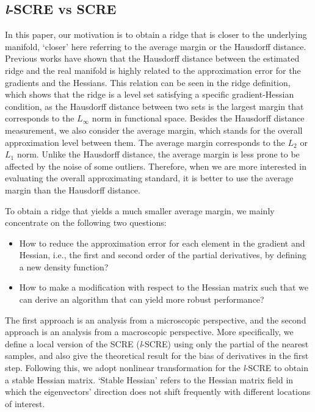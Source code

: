 \documentclass[aos,preprint]{imsart}
\theoremstyle{remark}
\begin{document}
\subsection{{\it l}-SCRE vs SCRE}
In this paper, our motivation is to obtain a ridge that is closer to the underlying manifold, `closer' here referring to the average margin or the Hausdorff distance. Previous works have shown that the Hausdorff distance between the estimated ridge and the real manifold is highly related to the approximation error for the gradients and the Hessians. This relation can be seen in the ridge definition, which shows that the ridge is a level set satisfying a specific gradient-Hessian condition, as the Hausdorff distance between two sets is the largest margin that corresponds to the $L_{\infty}$ norm in functional space. Besides the Hausdorff distance measurement, we also consider the average margin, which stands for the overall approximation level between them. The average margin corresponds to the $L_2$ or $L_1$ norm. Unlike the Hausdorff distance, the average margin is less prone to be affected by the noise of some outliers. Therefore, when we are more interested in evaluating the overall approximating standard, it is better to use the average margin than the Hausdorff distance.

To obtain a ridge that yields a much smaller average margin, we mainly concentrate on the following two questions:
\begin{itemize}
\item How to reduce the approximation error for each element in the gradient and Hessian, i.e., the first and second order of the partial derivatives, by defining a new density function?
\item How to make a modification with respect to the Hessian matrix such that we can derive an algorithm that can yield more robust performance?
\end{itemize}


The first approach is an analysis from a microscopic perspective, and the second approach is an analysis from a macroscopic perspective.
More specifically, we define a local version of the SCRE ({\it l}-SCRE) using only the partial of the nearest samples, and also give the theoretical result for the bias of derivatives in the first step. Following this, we adopt nonlinear transformation for the {\it l}-SCRE to obtain a stable Hessian matrix. `Stable Hessian' refers to the Hessian matrix field in which the eigenvectors' direction does not shift frequently with different locations of interest.
\end{document}
